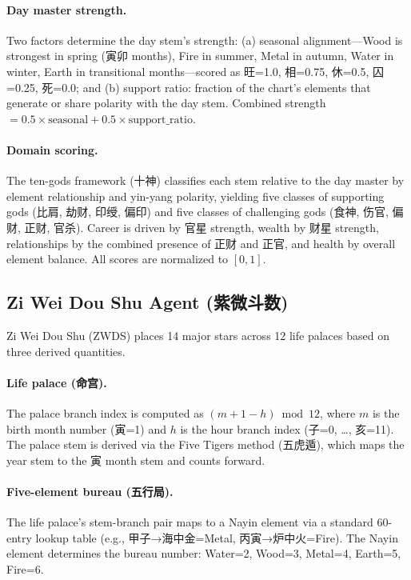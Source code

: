 \documentclass[11pt]{article}
\begin{document}
\paragraph{Day master strength.}
Two factors determine the day stem's strength: (a) seasonal alignment---Wood is strongest in spring (寅卯 months), Fire in summer, Metal in autumn, Water in winter, Earth in transitional months---scored as 旺=1.0, 相=0.75, 休=0.5, 囚=0.25, 死=0.0; and (b) support ratio: fraction of the chart's elements that generate or share polarity with the day stem.
Combined strength $= 0.5 \times \text{seasonal} + 0.5 \times \text{support\_ratio}$.

\paragraph{Domain scoring.}
The ten-gods framework (十神) classifies each stem relative to the day master by element relationship and yin-yang polarity, yielding five classes of supporting gods (比肩, 劫财, 印绶, 偏印) and five classes of challenging gods (食神, 伤官, 偏财, 正财, 官杀).
Career is driven by 官星 strength, wealth by 财星 strength, relationships by the combined presence of 正财 and 正官, and health by overall element balance.
All scores are normalized to $[0, 1]$.

\subsection{Zi Wei Dou Shu Agent (紫微斗数)}

Zi Wei Dou Shu (ZWDS) places 14 major stars across 12 life palaces based on three derived quantities.

\paragraph{Life palace (命宫).}
The palace branch index is computed as $(m + 1 - h) \bmod 12$, where $m$ is the birth month number (寅=1) and $h$ is the hour branch index (子=0, \ldots, 亥=11).
The palace stem is derived via the Five Tigers method (五虎遁), which maps the year stem to the 寅 month stem and counts forward.

\paragraph{Five-element bureau (五行局).}
The life palace's stem-branch pair maps to a Nayin element via a standard 60-entry lookup table (e.g., 甲子→海中金=Metal, 丙寅→炉中火=Fire).
The Nayin element determines the bureau number: Water=2, Wood=3, Metal=4, Earth=5, Fire=6.
\end{document}
